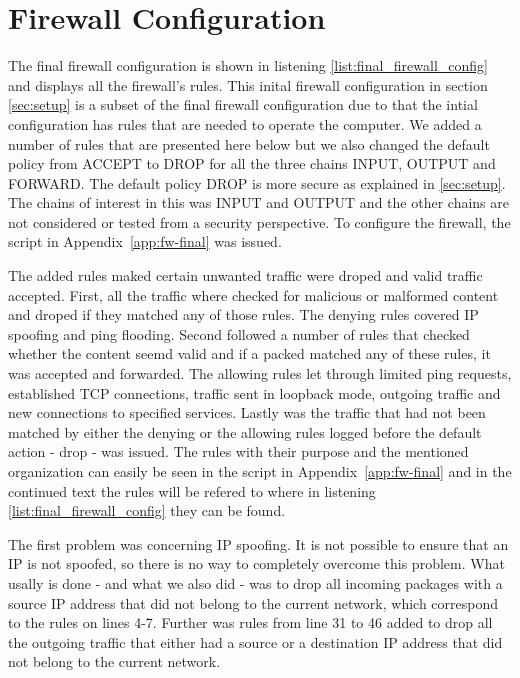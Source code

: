 \section{Firewall Configuration}
\label{sec:config}

The final firewall configuration is shown in listening \ref{list:final_firewall_config} and displays all the firewall's rules. This inital firewall configuration in section \ref{sec:setup} is a subset of the final firewall configuration due to that the intial configuration has rules that are needed to operate the computer. We added a number of rules that are presented here below but we also changed the default policy from ACCEPT to DROP for all the three chains INPUT, OUTPUT and FORWARD. The default policy DROP is more secure as explained in \ref{sec:setup}. The chains of interest in this \lab was INPUT and OUTPUT and the other chains are not considered or tested from a security perspective. To configure the firewall, the script in Appendix~\ref{app:fw-final} was issued.

The added rules maked certain unwanted traffic were droped and valid traffic accepted. First, all the traffic where checked for malicious or malformed content and droped if they matched any of those rules. The denying rules covered IP spoofing and ping flooding. Second followed a number of rules that checked whether the content seemd valid and if a packed matched any of these rules, it was accepted and forwarded. The allowing rules let through limited ping requests, established TCP connections, traffic sent in loopback mode, outgoing traffic and new connections to specified services. Lastly was the traffic that had not been matched by either the denying or the allowing rules logged before the default action - drop - was issued. The rules with their purpose and the mentioned organization can easily be seen in the script in Appendix~\ref{app:fw-final} and in the continued text the rules will be refered to where in listening \ref{list:final_firewall_config} they can be found.

The first problem was concerning IP spoofing. It is not possible to ensure that an IP is not spoofed, so there is no way to completely overcome this problem. What usally is done - and what we also did - was to drop all incoming packages with a source IP address that did not belong to the current network, which correspond to the rules on lines 4-7. Further was rules from line 31 to 46 added to drop all the outgoing traffic that either had a source or a destination IP address that did not belong to the current network. 

